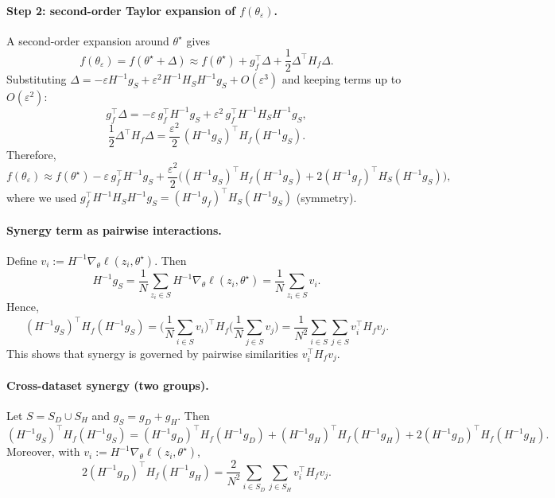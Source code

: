 \documentclass{article}
\theoremstyle{plain}
\theoremstyle{definition}
\theoremstyle{remark}
\begin{document}
\paragraph{Step 2: second-order Taylor expansion of $f(\theta_\varepsilon)$.}
A second-order expansion around $\theta^\star$ gives
\[
f(\theta_\varepsilon) = f(\theta^\star+\Delta)
\approx f(\theta^\star) + g_f^\top \Delta + \frac{1}{2}\Delta^\top H_f \Delta.
\]
Substituting $\Delta = -\varepsilon H^{-1}g_S + \varepsilon^2 H^{-1}H_S H^{-1}g_S + O(\varepsilon^3)$
and keeping terms up to $O(\varepsilon^2)$:
\[
g_f^\top\Delta
= -\varepsilon\, g_f^\top H^{-1}g_S
+\varepsilon^2\, g_f^\top H^{-1}H_S H^{-1}g_S,
\]
\[
\frac{1}{2}\Delta^\top H_f \Delta
= \frac{\varepsilon^2}{2}\,(H^{-1}g_S)^\top H_f (H^{-1}g_S).
\]
Therefore,
\[
f(\theta_\varepsilon)
\approx f(\theta^\star)
-\varepsilon\, g_f^\top H^{-1}g_S
+\frac{\varepsilon^2}{2}\Big(
(H^{-1}g_S)^\top H_f (H^{-1}g_S)
+2(H^{-1}g_f)^\top H_S (H^{-1}g_S)
\Big),
\]
where we used $g_f^\top H^{-1}H_S H^{-1}g_S = (H^{-1}g_f)^\top H_S (H^{-1}g_S)$ (symmetry).


\paragraph{Synergy term as pairwise interactions.}
Define $v_i := H^{-1}\nabla_\theta \ell(z_i,\theta^\star)$. Then
\[
H^{-1}g_S
=\frac{1}{N}\sum_{z_i\in S} H^{-1}\nabla_\theta \ell(z_i,\theta^\star)
=\frac{1}{N}\sum_{z_i\in S} v_i.
\]
Hence,
\[
(H^{-1}g_S)^\top H_f(H^{-1}g_S)
=\Big(\frac{1}{N}\sum_{i\in S} v_i\Big)^\top
H_f
\Big(\frac{1}{N}\sum_{j\in S} v_j\Big)
=\frac{1}{N^2}\sum_{i\in S}\sum_{j\in S} v_i^\top H_f v_j.
\]
This shows that synergy is governed by pairwise similarities $v_i^\top H_f v_j$.


\paragraph{Cross-dataset synergy (two groups).}
Let $S=S_D\cup S_H$ and $g_S=g_D+g_H$. Then
\[
(H^{-1}g_S)^\top H_f(H^{-1}g_S)
=
(H^{-1}g_D)^\top H_f(H^{-1}g_D)
+
(H^{-1}g_H)^\top H_f(H^{-1}g_H)
+
2(H^{-1}g_D)^\top H_f(H^{-1}g_H).
\]
Moreover, with $v_i:=H^{-1}\nabla_\theta \ell(z_i,\theta^\star)$,
\[
2(H^{-1}g_D)^\top H_f(H^{-1}g_H)
=\frac{2}{N^2}\sum_{i\in S_D}\sum_{j\in S_H} v_i^\top H_f v_j.
\]
\end{document}
